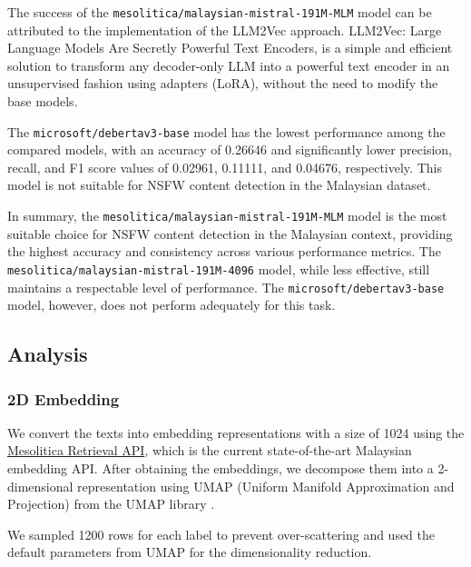 \documentclass[preprint]{article}
\begin{document}
The success of the \texttt{mesolitica/malaysian-mistral-191M-MLM} model can be attributed to the implementation of the LLM2Vec \cite{behnamghader2024llm2veclargelanguagemodels} approach. LLM2Vec: Large Language Models Are Secretly Powerful Text Encoders, is a simple and efficient solution to transform any decoder-only LLM into a powerful text encoder in an unsupervised fashion using adapters (LoRA), without the need to modify the base models.

The \texttt{microsoft/debertav3-base} model has the lowest performance among the compared models, with an accuracy of 0.26646 and significantly lower precision, recall, and F1 score values of 0.02961, 0.11111, and 0.04676, respectively. This model is not suitable for NSFW content detection in the Malaysian dataset.

In summary, the \texttt{mesolitica/malaysian-mistral-191M-MLM} model is the most suitable choice for NSFW content detection in the Malaysian context, providing the highest accuracy and consistency across various performance metrics. The \texttt{mesolitica/malaysian-mistral-191M-4096} model, while less effective, still maintains a respectable level of performance. The \texttt{microsoft/debertav3-base} model, however, does not perform adequately for this task.

\subsection{Analysis}

\subsubsection*{2D Embedding}

We convert the texts into embedding representations with a size of 1024 using the \href{https://mesolitica.com/retrieval}{Mesolitica Retrieval API}, which is the current state-of-the-art Malaysian embedding API. After obtaining the embeddings, we decompose them into a 2-dimensional representation using UMAP (Uniform Manifold Approximation and Projection) \cite{2018arXivUMAP} from the UMAP library \cite{mcinnes2018umap-software}.

We sampled 1200 rows for each label to prevent over-scattering and used the default parameters from UMAP for the dimensionality reduction.
\end{document}
